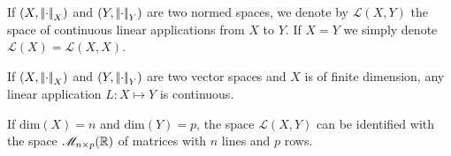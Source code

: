 \documentclass{article}
\begin{document}
\begin{definition}
	If $(X,\left|\negthinspace\left|\cdot\right|\negthinspace\right|_X)$ and $(Y,\left|\negthinspace\left|\cdot\right|\negthinspace\right|_Y)$ are two normed spaces, we denote by $\mathscr{L}(X,Y)$ the space of continuous linear applications from $X$ to $Y$. If $X=Y$ we simply denote $\mathscr{L}(X)=\mathscr{L}(X,X)$.
\end{definition}
\begin{proposition}
	If $(X,\left|\negthinspace\left|\cdot\right|\negthinspace\right|_X)$ and $(Y,\left|\negthinspace\left|\cdot\right|\negthinspace\right|_Y)$ are two vector spaces and $X$ is of finite dimension, any linear application $L:X\mapsto Y$ is continuous.
\end{proposition}
\begin{remark}
	If $\mathrm{dim}(X)=n$ and $\mathrm{dim}(Y)=p$, the space $\mathscr{L}(X,Y)$ can be identified with the space $\mathscr{M}_{n\times p}(\mathbb{R})$ of matrices with $n$ lines and $p$ rows.
\end{remark}
\end{document}
